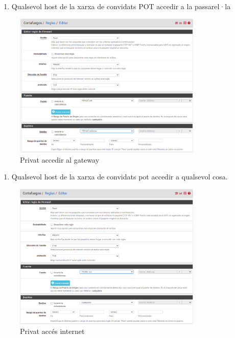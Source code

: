 \documentclass[
  10pt,
]{krantz}
\providecommand{\tightlist}{%
  \setlength{\itemsep}{0pt}\setlength{\parskip}{0pt}}
\begin{document}
\begin{enumerate}
\def\labelenumi{\arabic{enumi}.}
\setcounter{enumi}{2}
\tightlist
\item
  Qualsevol host de la xarxa de convidats POT accedir a la passarel·la
\end{enumerate}

\begin{figure}
\centering
\includegraphics[width=0.8\textwidth,height=\textheight]{imatges/proxmox/regla_privat3.png}
\caption{Privat accedir al gateway}
\end{figure}

\begin{enumerate}
\def\labelenumi{\arabic{enumi}.}
\setcounter{enumi}{3}
\tightlist
\item
  Qualsevol host de la xarxa de convidats pot accedir a qualsevol cosa.
\end{enumerate}

\begin{figure}
\centering
\includegraphics[width=0.8\textwidth,height=\textheight]{imatges/proxmox/regla_privat4.png}
\caption{Privat accés internet}
\end{figure}
\end{document}
